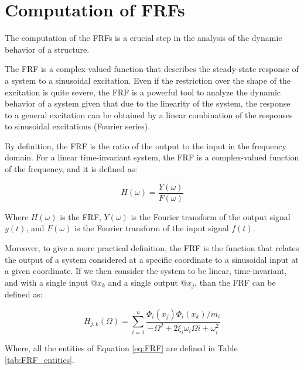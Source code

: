 \section{Computation of FRFs}
\label{sec:computation_of_FRFs}

The computation of the FRFs is a crucial step in the analysis of the dynamic behavior of a structure.

The FRF is a complex-valued function that describes the steady-state response of a system to a sinusoidal excitation.
Even if the restriction over the shape of the excitation is quite severe, the FRF is a powerful tool to analyze the dynamic behavior of a system given that due to the linearity of the system, the response to a general excitation can be obtained by a linear combination of the responses to sinusoidal excitations (Fourier series).

By definition, the FRF is the ratio of the output to the input in the frequency domain.
For a linear time-invariant system, the FRF is a complex-valued function of the frequency, and it is defined as:

\begin{equation}
    H(\omega) = \frac{Y(\omega)}{F(\omega)}
\end{equation}

Where $H(\omega)$ is the FRF, $Y(\omega)$ is the Fourier transform of the output signal $y(t)$, and $F(\omega)$ is the Fourier transform of the input signal $f(t)$.

Moreover, to give a more practical definition, the FRF is the function that relates the output of a system considered at a specific coordinate to a sinusoidal input at a given coordinate.
If we then consider the system to be linear, time-invariant, and with a single input $@x_k$ and a single output $@x_j$, than the FRF can be defined as:

\begin{equation}
    H_{j,k}(\Omega) = \sum_{i=1}^{n} \frac{\Phi_i(x_j) \Phi_i(x_k) / m_i}{-\Omega^2 + 2\xi_i \omega_i \Omega i + \omega_i^2}
    \label{eq:FRF}
\end{equation}

Where, all the entities of Equation \ref{eq:FRF} are defined in Table \ref{tab:FRF_entities}.


